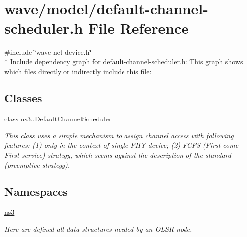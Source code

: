 \hypertarget{default-channel-scheduler_8h}{}\section{wave/model/default-\/channel-\/scheduler.h File Reference}
\label{default-channel-scheduler_8h}
{\ttfamily \#include \char`\"{}wave-\/net-\/device.\+h\char`\"{}}\\*
Include dependency graph for default-\/channel-\/scheduler.h\+:
This graph shows which files directly or indirectly include this file\+:
\subsection*{Classes}
\begin{DoxyCompactItemize}
\item 
class \hyperlink{classns3_1_1DefaultChannelScheduler}{ns3\+::\+Default\+Channel\+Scheduler}
\begin{DoxyCompactList}\small\item\em This class uses a simple mechanism to assign channel access with following features\+: (1) only in the context of single-\/\+P\+HY device; (2) F\+C\+FS (First come First service) strategy, which seems against the description of the standard (preemptive strategy). \end{DoxyCompactList}\end{DoxyCompactItemize}
\subsection*{Namespaces}
\begin{DoxyCompactItemize}
\item 
 \hyperlink{namespacens3}{ns3}
\begin{DoxyCompactList}\small\item\em Here are defined all data structures needed by an O\+L\+SR node. \end{DoxyCompactList}\end{DoxyCompactItemize}
